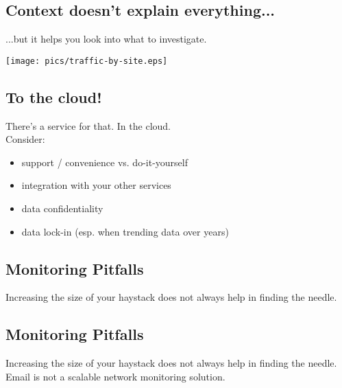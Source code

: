 \documentclass[xga]{xdvislides}
\begin{document}
\subsection{Context doesn't explain everything...}
...but it helps you look into what to investigate.

\begin{center}
	\texttt{[image: pics/traffic-by-site.eps]}
\end{center}

\subsection{To the cloud!}
There’s a service for that. In the cloud. \\

Consider:
\begin{itemize}
	\item support / convenience vs. do-it-yourself
	\item integration with your other services
	\item data confidentiality
	\item data lock-in (esp. when trending data over years)
\end{itemize}

\subsection{Monitoring Pitfalls}
\vspace*{\fill}
\Huge
\begin{center}
Increasing the size of your haystack does not always
help in finding the needle.
\end{center}
\Normalsize
\vspace*{\fill}

\subsection{Monitoring Pitfalls}
\vspace*{\fill}
\Huge
\begin{center}
Increasing the size of your haystack does not always
help in finding the needle. \\
\vspace{.2in}
Email is not a scalable network monitoring solution.
\end{center}
\Normalsize
\vspace*{\fill}
\end{document}
